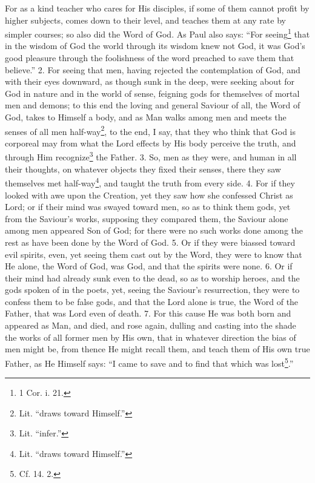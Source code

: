 For as a kind teacher who cares for His disciples, if some of them cannot profit by higher subjects, comes down to their level, and teaches them at any rate by simpler courses; so also did the Word of God. As Paul also says: “For seeing\footnote{1 Cor. i. 21.} that in the wisdom of God the world through its wisdom knew not God, it was God’s good pleasure through the foolishness of the word preached to save them that believe.” 2. For seeing that men, having rejected the contemplation of God, and with their eyes downward, as though sunk in the deep, were seeking about for God in nature and in the world of sense, feigning gods for themselves of mortal men and demons; to this end the loving and general Saviour of all, the Word of God, takes to Himself a body, and as Man walks among men and meets the senses of all men half-way\footnote{Lit. “draws toward Himself.”}, to the end, I say, that they who think that God is corporeal may from what the Lord effects by His body perceive the truth, and through Him recognize\footnote{Lit. “infer.”} the Father. 3. So, men as they were, and human in all their thoughts, on whatever objects they fixed their senses, there they saw themselves met half-way\footnote{Lit. “draws toward Himself.”}, and taught the truth from every side. 4. For if they looked with awe upon the Creation, yet they saw how she confessed Christ as Lord; or if their mind was swayed toward men, so as to think them gods, yet from the Saviour’s works, supposing they compared them, the Saviour alone among men appeared Son of God; for there were no such works done among the rest as have been done by the Word of God. 5. Or if they were biassed toward evil spirits, even, yet seeing them cast out by the Word, they were to know that He alone, the Word of God, was God, and that the spirits were none. 6. Or if their mind had already sunk even to the dead, so as to worship heroes, and the gods spoken of in the poets, yet, seeing the Saviour’s resurrection, they were to confess them to be false gods, and that the Lord alone is true, the Word of the Father, that was Lord even of death. 7. For this cause He was both born and appeared as Man, and died, and rose again, dulling and casting into the shade the works of all former men by His own, that in whatever direction the bias of men might be, from thence He might recall them, and teach them of His own true Father, as He Himself says: “I came to save and to find that which was lost\footnote{Cf. 14. 2.}.”


